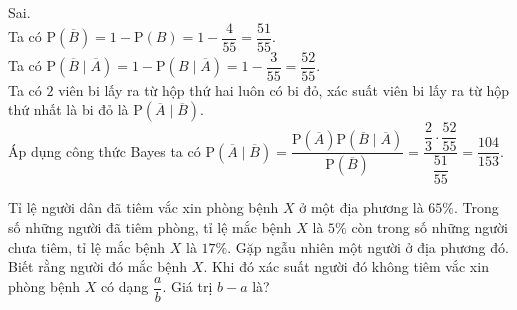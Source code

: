\begin{ex}
{\begin{itemchoice}
			\itemch Sai.\\
			Ta có $\mathrm{P}(\overline{B})=1-\mathrm{P}(B)=1-\dfrac{4}{55}=\dfrac{51}{55}$.\\
			Ta có $\mathrm{P}(\overline{B} \mid \overline{A}) = 1-\mathrm{P}(B \mid \overline{A}) = 1-\dfrac{3}{55}=\dfrac{52}{55}$.\\
			Ta có $2$ viên bi lấy ra từ hộp thứ hai luôn có bi đỏ, xác suất viên bi lấy ra từ hộp thứ nhất là bi đỏ là $\mathrm{P}(\overline{A}\mid \overline{B})$.\\
			Áp dụng công thức Bayes ta có
			$\mathrm{P}(\overline{A}\mid \overline{B}) =\dfrac{\mathrm{P}(\overline{A}) \mathrm{P}(\overline{B} \mid \overline{A})}{\mathrm{P}(\overline{B})} = \dfrac{\dfrac{2}{3} \cdot \dfrac{52}{55}}{ \dfrac{51}{55}} = \dfrac{104}{153}$.
		\end{itemchoice}
	}
\end{ex}

\begin{ex}[CTST]%
	Tỉ lệ người dân đã tiêm vắc xin phòng bệnh $X$ ở một địa phương là $65\%$. Trong số những 
	người đã tiêm phòng, tỉ lệ mắc bệnh $X$ là $5\%$ còn trong số những người chưa tiêm, tỉ lệ 
	mắc bệnh $X$ là $17\%$. Gặp ngẫu nhiên một người ở địa phương đó. Biết rằng người đó mắc bệnh $X$. Khi đó xác suất người đó không tiêm vắc xin phòng bệnh $X$ có dạng $\dfrac{a}{b}$. Giá trị $b-a$ là?
\end{ex}

